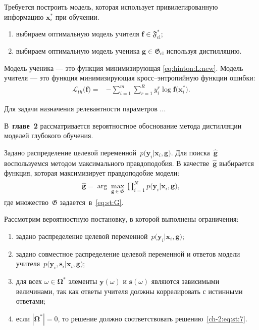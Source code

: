 \documentclass{dissert}
\begin{document}
Требуется построить модель, которая использует привилегированную информацию $\mathbf{x}^*_i$ при обучении.
\begin{enumerate}
    \item выбираем оптимальную модель учителя $\mathbf{f} \in \mathfrak{F}_{\text{cl}}^*$;
    \item выбираем оптимальную модель ученика $\mathbf{g} \in \mathfrak{G}_{\text{cl}}$ используя дистилляцию. 
\end{enumerate}

Модель ученика --- это функция минимизирующая \eqref{eq:hinton:L:new}. Модель учителя --- это функция минимизирующая кросс--энтропийную функции ошибки:
\[
\label{eq:hinton.2}
\begin{aligned}
   \mathcal{L}_{th}\bigr(\mathbf{f}\bigr) = &-\sum_{i=1}^{m}{{\sum_{r=1}^{R}y^r_i\log\mathbf{f}\bigr(\mathbf{x}^*_i\bigr)}}.
   \end{aligned}
\]

Для задачи назначения релевантности параметров ...

В~\textbf{главе~2} рассматривается вероятностное обоснование метода дистилляции моделей глубокого обучения.

Задано распределение целевой переменной~$p\bigr(\mathbf{y}_i|\mathbf{x}_i, \mathbf{g}\bigr)$.
Для поиска~$\hat{\mathbf{g}}$ воспользуемся методом максимального правдоподобия. В качестве~$\hat{\mathbf{g}}$ выбирается функция, которая максимизирует правдоподобие модели:
\begin{gather}
\label{ch-2:eq:st:7}
\begin{aligned}
\hat{\mathbf{g}} = \arg\max_{\mathbf{g}\in \mathfrak{G}} \prod_{i=1}^{N}p\bigr(\mathbf{y}_{i}|\mathbf{x}_i, \mathbf{g}\bigr),
\end{aligned}
\end{gather}
где множество~$\mathfrak{G}$ задается~в~\eqref{eq:st:G}.


Рассмотрим вероятностную постановку, в которой выполнены ограничения:
\begin{enumerate}[1)]
	\item задано распределение целевой переменной~$p\bigr(\mathbf{y}_i|\mathbf{x}_i, \mathbf{g}\bigr)$;
	\item задано совместное распределение целевой переменной и ответов модели учителя~$p\bigr(\mathbf{y}_i, \mathbf{s}_i|\mathbf{x}_i, \mathbf{g}\bigr)$;
	\item для всех $\omega \in \bm{\Omega}^*$ элементы $\mathbf{y}(\omega)$ и $\mathbf{s}(\omega)$ являются зависимыми величинами, так как ответы учителя должны коррелировать с истинными ответами;
	\item если $|\bm{\Omega}^*|=0$, то решение должно соответствовать решению~\eqref{ch-2:eq:st:7}.
\end{enumerate}
\end{document}
